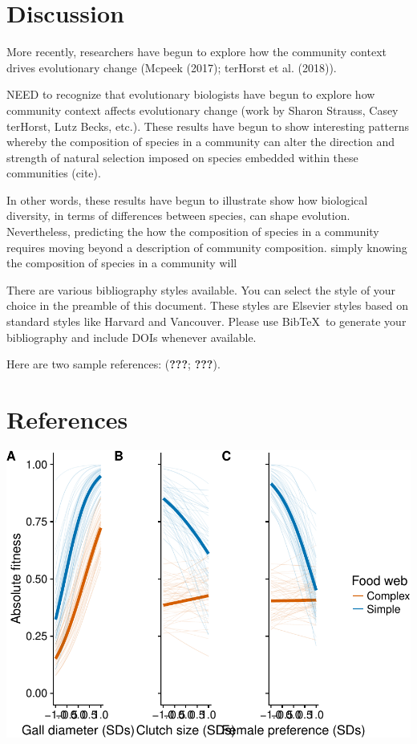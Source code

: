 \documentclass[]{elsarticle} %
\makeatletter
\def\maxwidth{\ifdim\Gin@nat@width>\linewidth\linewidth
\else\Gin@nat@width\fi}
\let\Oldincludegraphics\includegraphics
\renewcommand{\includegraphics}[1]{\Oldincludegraphics[width=\maxwidth]{#1}}
\makeatother
\begin{document}
\section{Discussion}\label{discussion}

More recently, researchers have begun to explore how the community
context drives evolutionary change (Mcpeek (2017); terHorst et al.
(2018)).

NEED to recognize that evolutionary biologists have begun to explore how
community context affects evolutionary change (work by Sharon Strauss,
Casey terHorst, Lutz Becks, etc.). These results have begun to show
interesting patterns whereby the composition of species in a community
can alter the direction and strength of natural selection imposed on
species embedded within these communities (cite).

In other words, these results have begun to illustrate show how
biological diversity, in terms of differences between species, can shape
evolution. Nevertheless, predicting the how the composition of species
in a community requires moving beyond a description of community
composition. simply knowing the composition of species in a community
will

There are various bibliography styles available. You can select the
style of your choice in the preamble of this document. These styles are
Elsevier styles based on standard styles like Harvard and Vancouver.
Please use BibTeX~to generate your bibliography and include DOIs
whenever available.

Here are two sample references: ({\textbf{???}}; {\textbf{???}}).

\section*{References}\label{references}

\includegraphics{elsevier_test_files/figure-latex/Figure S1 Univariate Absolute Fitness Landscapes-1.pdf}
\end{document}
